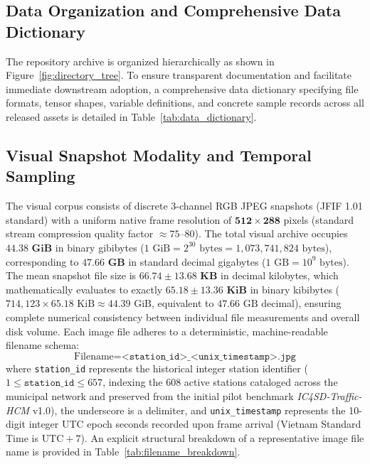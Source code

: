 \documentclass[preprint,12pt]{elsarticle}
\begin{document}
\subsection{Data Organization and Comprehensive Data Dictionary}
The repository archive is organized hierarchically as shown in Figure~\ref{fig:directory_tree}. To ensure transparent documentation and facilitate immediate downstream adoption, a comprehensive data dictionary specifying file formats, tensor shapes, variable definitions, and concrete sample records across all released assets is detailed in Table~\ref{tab:data_dictionary}.


\FloatBarrier

\subsection{Visual Snapshot Modality and Temporal Sampling}
The visual corpus consists of discrete 3-channel RGB JPEG snapshots (JFIF 1.01 standard) with a uniform native frame resolution of $\mathbf{512 \times 288}$ pixels (standard stream compression quality factor $\approx 75$--$80$). The total visual archive occupies $\mathbf{44.38\text{ GiB}}$ in binary gibibytes ($1\text{ GiB} = 2^{30}\text{ bytes} = 1,073,741,824\text{ bytes}$), corresponding to $\mathbf{47.66\text{ GB}}$ in standard decimal gigabytes ($1\text{ GB} = 10^9\text{ bytes}$). The mean snapshot file size is $\mathbf{66.74 \pm 13.68\text{ KB}}$ in decimal kilobytes, which mathematically evaluates to exactly $\mathbf{65.18 \pm 13.36\text{ KiB}}$ in binary kibibytes ($714,123 \times 65.18\text{ KiB} \approx 44.39\text{ GiB}$, equivalent to $47.66\text{ GB}$ decimal), ensuring complete numerical consistency between individual file measurements and overall disk volume. Each image file adheres to a deterministic, machine-readable filename schema:
\begin{equation}
    \text{Filename} = \texttt{<station\_id>\_<unix\_timestamp>.jpg}
\end{equation}
where \texttt{station\_id} represents the historical integer station identifier ($1 \le \texttt{station\_id} \le 657$, indexing the 608 active stations cataloged across the municipal network and preserved from the initial pilot benchmark \textit{IC4SD-Traffic-HCM} v1.0), the underscore is a delimiter, and \texttt{unix\_timestamp} represents the 10-digit integer UTC epoch seconds recorded upon frame arrival (Vietnam Standard Time is $\text{UTC} + 7$). An explicit structural breakdown of a representative image file name is provided in Table~\ref{tab:filename_breakdown}.
\end{document}
